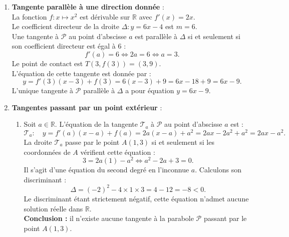 \documentclass[11pt,a4paper]{article}
\newcommand{\R}{\mathbb{R}}
\begin{document}
\begin{correctionbox}
\begin{enumerate}[label=\textbf{\arabic*.}]
    \item \textbf{Tangente parallèle à une direction donnée} :\\
    La fonction $f : x \mapsto x^2$ est dérivable sur $\R$ avec $f'(x) = 2x$.\\
    Le coefficient directeur de la droite $\Delta : y = 6x - 4$ est $m = 6$.\\
    Une tangente à $\mathcal{P}$ au point d'abscisse $a$ est parallèle à $\Delta$ si et seulement si son coefficient directeur est égal à $6$ :
    \[
    f'(a) = 6 \iff 2a = 6 \iff a = 3.
    \]
    Le point de contact est $T(3, f(3)) = (3, 9)$.\\
    L'équation de cette tangente est donnée par :
    \[
    y = f'(3)(x - 3) + f(3) = 6(x - 3) + 9 = 6x - 18 + 9 = 6x - 9.
    \]
    L'unique tangente à $\mathcal{P}$ parallèle à $\Delta$ a pour équation $y = 6x - 9$.

    \item \textbf{Tangentes passant par un point extérieur} :
    \begin{enumerate}[label=\alph*.]
        \item Soit $a \in \R$. L'équation de la tangente $\mathcal{T}_a$ à $\mathcal{P}$ au point d'abscisse $a$ est :
        \[
        \mathcal{T}_a : \quad y = f'(a)(x - a) + f(a) = 2a(x - a) + a^2 = 2ax - 2a^2 + a^2 = 2ax - a^2.
        \]
        La droite $\mathcal{T}_a$ passe par le point $A(1, 3)$ si et seulement si les coordonnées de $A$ vérifient cette équation :
        \[
        3 = 2a(1) - a^2 \iff a^2 - 2a + 3 = 0.
        \]
        Il s'agit d'une équation du second degré en l'inconnue $a$. Calculons son discriminant :
        \[
        \Delta = (-2)^2 - 4 \times 1 \times 3 = 4 - 12 = -8 < 0.
        \]
        Le discriminant étant strictement négatif, cette équation n'admet aucune solution réelle dans $\R$.\\
        \textbf{Conclusion :} il n'existe aucune tangente à la parabole $\mathcal{P}$ passant par le point $A(1, 3)$.


\end{enumerate}
\end{enumerate}
\end{correctionbox}
\end{document}
